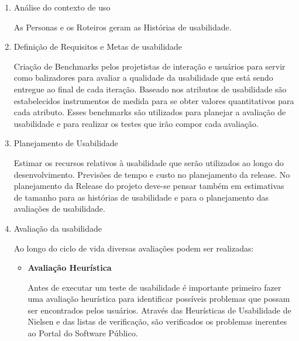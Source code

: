 \begin{enumerate}
\begin{itemize}
	\end{itemize}
			
		
\item Análise do contexto de uso

		As Personas e os Roteiros geram as Histórias de usabilidade.

\item Definição de Requisitos e Metas de usabilidade

	Criação de Benchmarks pelos projetistas de interação e usuários para servir como balizadores para avaliar a qualidade da usabilidade que está sendo entregue ao final de cada iteração.
	Baseado nos atributos de usabilidade são estabelecidos instrumentos de medida para se obter valores quantitativos 	para cada atributo.
	Esses benchmarks são utilizados para planejar a avaliação de usabilidade e para realizar os testes que irão compor cada avaliação. %
	
		
\item Planejamento de Usabilidade

	Estimar os recursos relativos à usabilidade que serão utilizados ao longo do desenvolvimento. Previsões de tempo e custo no planejamento da release.
	 No planejamento da Release do projeto deve-se pensar também em estimativas de tamanho para as histórias de usabilidade e para o planejamento das avaliações de usabilidade.


\item Avaliação da usabilidade

	Ao longo do ciclo de vida diversas avaliações podem ser realizadas:
	
		
	\begin{itemize}
		\item \textbf{Avaliação Heurística}
		
		Antes de executar um teste de usabilidade é importante primeiro fazer uma avaliação heurística para identificar possíveis problemas que possam ser encontrados pelos usuários. Através das Heurísticas de Usabilidade de Nielsen e das listas de verificação, são verificados os problemas inerentes ao Portal do Software Público.
		
	

\end{itemize}
\end{enumerate}
